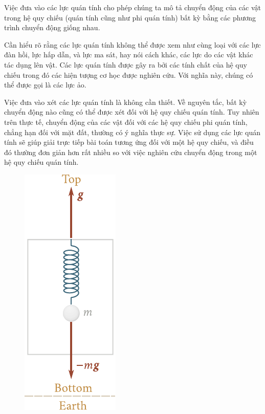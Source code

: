 Việc đưa vào các lực quán tính cho phép chúng ta mô tả chuyển động của các vật trong hệ quy chiếu (quán tính cũng như phi quán tính) bất kỳ bằng các phương trình chuyển động giống nhau.

Cần hiểu rõ rằng các lực quán tính không thể được xem như cùng loại với các lực đàn hồi, lực hấp dẫn, và lực ma sát, hay nói cách khác, các lực do các vật khác tác dụng lên vật. Các lực quán tính được gây ra bởi các tính chất của hệ quy chiếu trong đó các hiện tượng cơ học được nghiên cứu. Với nghĩa này, chúng có thể được gọi là các lực ảo.

Việc đưa vào xét các lực quán tính là không cần thiết. Về nguyên tắc, bất kỳ chuyển động nào cũng có thể được xét đối với hệ quy chiếu quán tính. Tuy nhiên trên thực tế, chuyển động của các vật đối với các hệ quy chiếu phi quán tính, chẳng hạn đối với mặt đất, thường có ý nghĩa thực sự. Việc sử dụng các lực quán tính sẽ giúp giải trực tiếp bài toán tương ứng đối với một hệ quy chiếu, và điều đó thường đơn giản hơn rất nhiều so với việc nghiên cứu chuyển động trong một hệ quy chiếu quán tính.

\begin{figure}[!htb]
	\begin{center}
		\includegraphics[scale=0.85]{figures/ch_04/fig_4_2.pdf}
		\caption[]{}
		\label{fig:4_2}
	\end{center}
\end{figure}

